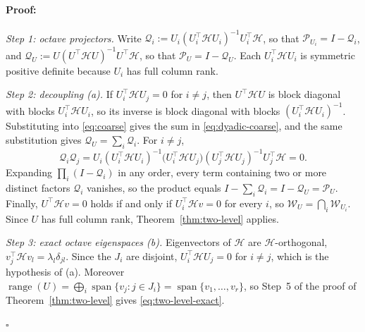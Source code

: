 \documentclass{article}
\newenvironment{proof}{\paragraph{Proof:}}{\hfill$\square$}
\begin{document}
\begin{proof}
\emph{Step 1: octave projectors.} Write $\mathcal Q_i:=U_i(U_i^\top\mathcal HU_i)^{-1}U_i^\top\mathcal H$, so that $\mathcal P_{U_i}=I-\mathcal Q_i$, and $\mathcal Q_U:=U(U^\top\mathcal HU)^{-1}U^\top\mathcal H$, so that $\mathcal P_U=I-\mathcal Q_U$. Each $U_i^\top\mathcal HU_i$ is symmetric positive definite because $U_i$ has full column rank.

\emph{Step 2: decoupling (a).} If $U_i^\top\mathcal HU_j=0$ for $i\neq j$, then $U^\top\mathcal HU$ is block diagonal with blocks $U_i^\top\mathcal HU_i$, so its inverse is block diagonal with blocks $(U_i^\top\mathcal HU_i)^{-1}$. Substituting into \eqref{eq:coarse} gives the sum in \eqref{eq:dyadic-coarse}, and the same substitution gives $\mathcal Q_U=\sum_i\mathcal Q_i$. For $i\neq j$,
\[
\mathcal Q_i\mathcal Q_j=U_i(U_i^\top\mathcal HU_i)^{-1}\big(U_i^\top\mathcal HU_j\big)(U_j^\top\mathcal HU_j)^{-1}U_j^\top\mathcal H=0 .
\]
Expanding $\prod_i(I-\mathcal Q_i)$ in any order, every term containing two or more distinct factors $\mathcal Q_i$ vanishes, so the product equals $I-\sum_i\mathcal Q_i=I-\mathcal Q_U=\mathcal P_U$. Finally, $U^\top\mathcal Hv=0$ holds if and only if $U_i^\top\mathcal Hv=0$ for every $i$, so $\mathcal W_U=\bigcap_i\mathcal W_{U_i}$. Since $U$ has full column rank, Theorem~\ref{thm:two-level} applies.

\emph{Step 3: exact octave eigenspaces (b).} Eigenvectors of $\mathcal H$ are $\mathcal H$-orthogonal, $v_j^\top\mathcal Hv_l=\lambda_l\delta_{jl}$. Since the $J_i$ are disjoint, $U_i^\top\mathcal HU_j=0$ for $i\neq j$, which is the hypothesis of (a). Moreover $\operatorname{range}(U)=\bigoplus_i\operatorname{span}\{v_j:j\in J_i\}=\operatorname{span}\{v_1,\dots,v_r\}$, so Step~5 of the proof of Theorem~\ref{thm:two-level} gives \eqref{eq:two-level-exact}.


\end{proof}
\end{document}
